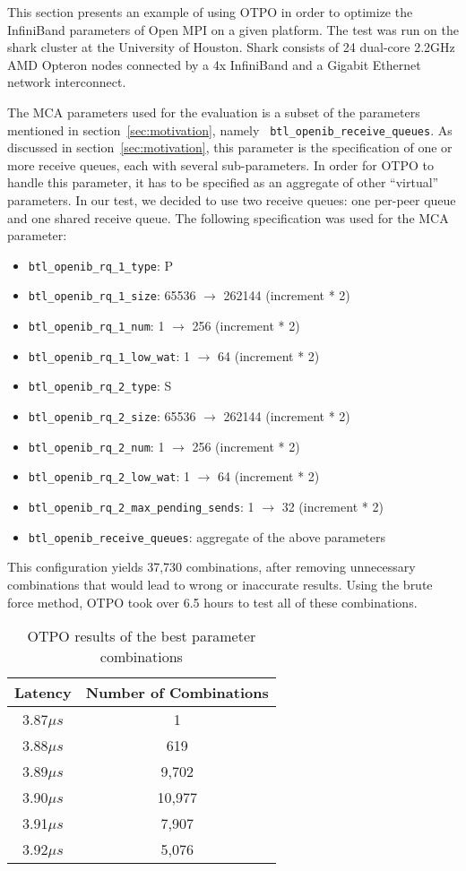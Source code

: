 This section presents an example of using OTPO in order to optimize the InfiniBand parameters of Open MPI on a given platform. The test was run on the shark cluster at the University of Houston. Shark consists of 24 dual-core 2.2GHz AMD Opteron nodes connected by a 4x InfiniBand and a Gigabit Ethernet network interconnect.

The MCA parameters used for the evaluation is a subset of the
parameters mentioned in section~\ref{sec:motivation}, namely {\tt
  btl\_openib\_receive\_queues}. As discussed in
section~\ref{sec:motivation}, this parameter is the specification of
one or more receive queues, each with several sub-parameters.  In
order for OTPO to handle this parameter, it has to be specified as an
aggregate of other ``virtual'' parameters. In our test, we decided to
use two receive queues: one per-peer queue and one shared receive
queue. The following specification was used for the MCA parameter:

\begin{itemize}
\item {\tt btl\_openib\_rq\_1\_type}: P
\item {\tt btl\_openib\_rq\_1\_size}: 65536 $\rightarrow$ 262144 (increment * 2)
\item {\tt btl\_openib\_rq\_1\_num}: 1 $\rightarrow$ 256 (increment * 2)
\item {\tt btl\_openib\_rq\_1\_low\_wat}: 1 $\rightarrow$ 64 (increment * 2)
\item {\tt btl\_openib\_rq\_2\_type}: S
\item {\tt btl\_openib\_rq\_2\_size}: 65536 $\rightarrow$ 262144 (increment * 2)
\item {\tt btl\_openib\_rq\_2\_num}: 1 $\rightarrow$ 256 (increment * 2)
\item {\tt btl\_openib\_rq\_2\_low\_wat}: 1 $\rightarrow$ 64 (increment * 2)
\item {\tt btl\_openib\_rq\_2\_max\_pending\_sends}: 1 $\rightarrow$ 32 (increment * 2)
\item {\tt btl\_openib\_receive\_queues}: aggregate of the above parameters
\end{itemize}

This configuration yields 37,730 combinations, after removing
unnecessary combinations that would lead to wrong or inaccurate
results.  Using the brute force method, OTPO took over 6.5 hours to
test all of these combinations.

\begin{table}[tb]
\centering
\begin{tabular}{|c|c|} \hline
Latency & Number of Combinations \\
\hline
3.87$\mu s$  & 1\\
\hline
3.88$\mu s$  & 619\\
\hline
3.89$\mu s$  & 9,702\\
\hline
3.90$\mu s$  & 10,977\\
\hline
3.91$\mu s$  & 7,907\\
\hline
3.92$\mu s$  & 5,076\\
\hline
\end{tabular}  
\caption{OTPO results of the best parameter combinations}
\label{table:results} 
\end{table}

